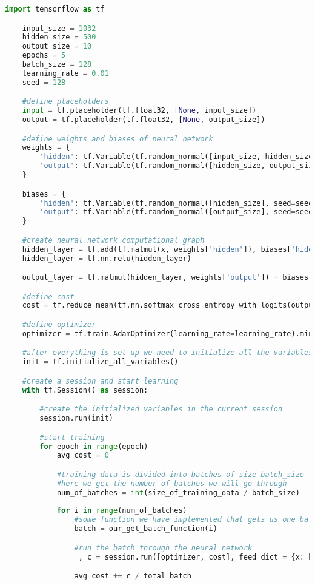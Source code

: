 \begin{lstlisting}[language=Python]
	import tensorflow as tf

	input_size = 1032
	hidden_size = 500
	output_size = 10
	epochs = 5
	batch_size = 128
	learning_rate = 0.01
	seed = 128

	#define placeholders
	input = tf.placeholder(tf.float32, [None, input_size])
	output = tf.placeholder(tf.float32, [None, output_size])

	#define weights and biases of neural network
	weights = {
		'hidden': tf.Variable(tf.random_normal([input_size, hidden_size], seed=seed)),
		'output': tf.Variable(tf.random_normal([hidden_size, output_size], seed=seed))
	}

	biases = {
		'hidden': tf.Variable(tf.random_normal([hidden_size], seed=seed)),
    	'output': tf.Variable(tf.random_normal([output_size], seed=seed))
	}

	#create neural network computational graph
	hidden_layer = tf.add(tf.matmul(x, weights['hidden']), biases['hidden'])
	hidden_layer = tf.nn.relu(hidden_layer)

	output_layer = tf.matmul(hidden_layer, weights['output']) + biases['output']

	#define cost
	cost = tf.reduce_mean(tf.nn.softmax_cross_entropy_with_logits(output_layer, y))

	#define optimizer
	optimizer = tf.train.AdamOptimizer(learning_rate=learning_rate).minimize(cost)

	#after everything is set up we need to initialize all the variables
	init = tf.initialize_all_variables()

	#create a session and start learning
	with tf.Session() as session:

		#create the initialized variables in the current session
		session.run(init)

		#start training
		for epoch in range(epoch)
			avg_cost = 0

			#training data is divided into batches of size batch_size
			#here we get the number of batches we will go through
			num_of_batches = int(size_of_training_data / batch_size)
			
			for i in range(num_of_batches)
				#some function we have implemented that gets us one batch of training data
				batch = our_get_batch_function(i)

				#run the batch through the neural network
				_, c = session.run([optimizer, cost], feed_dict = {x: batch})

				avg_cost += c / total_batch
\end{lstlisting}
